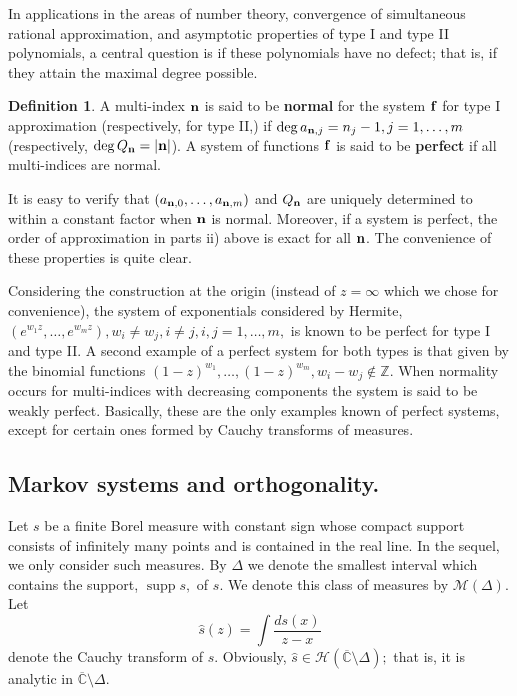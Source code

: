 \documentclass{amsart}
\theoremstyle{definition}
\newtheorem{defi}{\sc Definition}[section]
\theoremstyle{remark}
\newcommand{\supp}{\operatorname{supp }}
\begin{document}
In applications in the areas of number theory, convergence of simultaneous rational approximation, and asymptotic properties of type I and type II polynomials, a central question is if these polynomials have no defect; that is, if they attain the maximal degree possible.

\begin{defi}\label{def1}
A multi-index ${\bf n}$ is said to be {\bf normal} for the system ${\bf f}$ for type I approximation (respectively, for type II,) if $\deg a_{{\bf n},j} = n_j -1, j=1,\ldots,m$ (respectively, $\deg Q_{\bf n} = |{\bf n}|$). A system of functions ${\bf f}$ is said to be {\bf perfect} if all multi-indices are normal.
\end{defi}

It is easy to verify that $(a_{{\bf n},0},\ldots,a_{{\bf n},m})$ and $Q_{\bf n}$ are uniquely determined to within a constant factor when ${\bf n}$ is normal. Moreover, if a system is perfect, the order of approximation in parts ii) above is exact for all ${\bf n}$. The convenience of these properties is quite clear.


Considering the construction at the origin (instead of $z=\infty$ which we chose for convenience), the system of exponentials considered by Hermite, $(e^{w_1z},\ldots,e^{w_mz}), w_i \neq w_j, i \neq j, i,j = 1,\ldots,m, $ is known to be perfect for type I and type II. A second example of a perfect system for both types is that given by the binomial functions $(1-z)^{w_1},\ldots,(1-z)^{w_m}, w_i -w_j \not\in {\mathbb{Z}}$.  When normality occurs for multi-indices with decreasing components the system is said to be weakly perfect. Basically, these are the only examples known of perfect  systems, except for certain ones formed by Cauchy transforms of measures.

\subsection{Markov systems and orthogonality.} Let $s$ be a finite Borel measure with constant sign whose compact support consists of infinitely many points and is contained in the real line.  In the sequel, we only consider such measures. By $\Delta$ we denote the smallest interval which contains the support, $\supp{s},$ of $s$. We denote this class of measures by ${\mathcal{M}}(\Delta)$. Let
\[ \widehat{s}(z) = \int \frac{ds(x)}{z-x}
\]
denote the Cauchy transform of $s$. Obviously, $\widehat{s} \in {\mathcal{H}}(\overline{\mathbb{C}}\setminus \Delta);$  that is, it is analytic in $\overline{\mathbb{C}}\setminus \Delta.$
\end{document}
